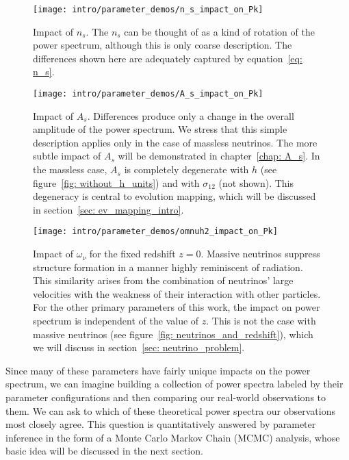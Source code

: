 \begin{figure}[htb]
  \centering
  \texttt{[image: intro/parameter\_demos/n\_s\_impact\_on\_Pk]}
  \caption[Impact of $n_s$ on $P(k)$]{Impact of $n_s$. The $n_s$ can be
  thought of as a kind of rotation of the power spectrum, although this
  is only coarse description. The differences shown here are
  adequately captured by equation~\ref{eq: n_s}.}
  \label{fig: n_s_dependence}
\end{figure}

\begin{figure}[htb]
  \centering
  \texttt{[image: intro/parameter\_demos/A\_s\_impact\_on\_Pk]}
  \caption[Impact of $A_s$ on $P(k)$]{Impact of $A_s$. Differences produce
  	only a change in the overall amplitude of the power spectrum. We stress
  	that this simple description applies only in the case of massless
  	neutrinos. The more subtle impact of $A_s$ will be demonstrated in
  	chapter~\ref{chap: A_s}. In the massless case, $A_s$ is completely
  	degenerate with $h$ (see figure~\ref{fig: without_h_units}) and with
  	$\sigma_{12}$ (not shown). This degeneracy is central to evolution
  	mapping, which will be discussed in section~\ref{sec: ev_mapping_intro}.}
  \label{fig: A_s_dependence}
\end{figure}

\begin{figure}[htb]
  \centering
  \texttt{[image: intro/parameter\_demos/omnuh2\_impact\_on\_Pk]}
  \caption[Impact of $\omega_\nu$ on $P(k)$]{Impact of $\omega_\nu$ for the
  	fixed redshift $z=0$. Massive neutrinos suppress structure formation in
  	a manner highly reminiscent of radiation. This similarity arises from the
  	combination of neutrinos' large velocities with the weakness of their 
  	interaction with other particles.
  	For the other primary parameters of this work,
  	the impact on power spectrum is independent of the value of $z$. This is
  	not the case with massive neutrinos
  	(see figure~\ref{fig: neutrinos_and_redshift}), which we will discuss in
  	section~\ref{sec: neutrino_problem}.}
  \label{fig: omega_nu_dependence}
\end{figure}


Since many of these parameters have fairly unique impacts on the power 
spectrum, we can imagine building a collection of power spectra labeled by
their parameter configurations and then comparing our real-world observations 
to them. We can ask to which of these theoretical power spectra our 
observations most closely agree. This question is quantitatively answered by 
parameter inference in the form of a Monte Carlo Markov Chain (MCMC) analysis, whose basic idea will be discussed in the next section.

